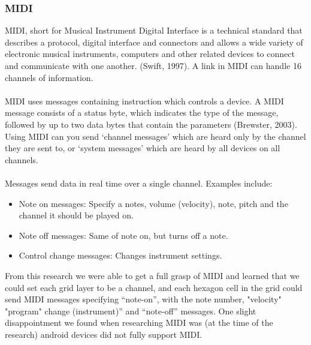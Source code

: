 \documentclass[10pt,a4paper]{article}
\begin{document}
\subsubsection{MIDI}
MIDI, short for Musical Instrument Digital Interface is a technical standard that describes a protocol, digital interface and connectors and allows a wide variety of electronic musical instruments, computers and other related devices to connect and communicate with one another. (Swift, 1997). A link in MIDI can handle 16 channels of information.\\
\\
MIDI uses messages containing instruction which controls a device. A MIDI message consists of a status byte, which indicates the type of the message, followed by up to two data bytes that contain the parameters (Brewster, 2003). Using MIDI can you send ‘channel messages’ which are heard only by the channel they are sent to, or ‘system messages’ which are heard by all devices on all channels.\\
\\
Messages send data in real time over a single channel. Examples include\cite{Huber}:
\begin{itemize}
\item Note on messages: Specify a notes, volume (velocity), note, pitch and the channel it should be played on.
\item Note off messages: Same of note on, but turns off a note.
\item Control change messages: Changes instrument settings.
\end{itemize}
From this research we were able to get a full grasp of MIDI and learned that we could set each grid layer to be a channel, and each hexagon cell in the grid could send MIDI messages specifying “note-on”, with the note number, "velocity" "program" change (instrument)” and “note-off” messages. One slight disappointment we found when researching MIDI was (at the time of the research) android devices did not fully support MIDI. 
\end{document}
